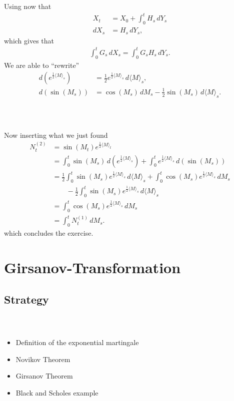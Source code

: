\documentclass{beamer}
\numberwithin{equation}{section}
\newenvironment{frame2}{\begin{frame}\frametitle{{\normalsize \secname} \\ {\large \subsecname}}}{\end{frame}}
\begin{document}
\begin{frame2}
    Using now that
    \begin{align*}
        X_t &= X_0 + \int_0^t H_s \, dY_s \\
        dX_s &= H_s \, dY_s, 
    \end{align*}
    which gives that
    \begin{align*}
        \int_0^t G_s \, d X_s = \int_0^t G_s H_s \, dY_s.
    \end{align*}
    We are able to ``rewrite''
    \begin{align*}
        d\left(e^{\frac{1}{2}\langle M \rangle_s}\right) &= \frac{1}{2}e^{\frac{1}{2}\langle M \rangle_s} \, d \langle M \rangle_s, \\
        d \left(\sin(M_s)\right) &= \cos(M_s) \, dM_s - \frac{1}{2}\sin(M_s)\, d\langle M \rangle_s.
    \end{align*}
\end{frame2}

\begin{frame2}
    Now inserting what we just found
    \begin{align*}
        N_t^{(2)} &= \sin(M_t)e^{\frac{1}{2}\langle M \rangle_t} \\
       &= \int_0^t \sin(M_s) \, d\left(e^{\frac{1}{2}\langle M \rangle_s}\right) + \int_0^t e^{\frac{1}{2}\langle M \rangle_s} \, d \left(\sin(M_s)\right) \\
       &= \frac{1}{2}\int_0^t\sin(M_s)e^{\frac{1}{2}\langle M \rangle_s}\, d\langle M \rangle_s + \int_0^t\cos(M_s)e^{\frac{1}{2}\langle M \rangle_s}\, dM_s \\
       &\qquad - \frac{1}{2}\int_0^t\sin(M_s)e^{\frac{1}{2}\langle M \rangle_s}\, d\langle M \rangle_s \\
       &= \int_0^t\cos(M_s)e^{\frac{1}{2}\langle M \rangle_s}\, dM_s \\
       &= \int_0^tN_t^{(1)} \, dM_s.
   \end{align*}
   which concludes the exercise.
\end{frame2}

\section{Girsanov-Transformation}

\subsection{Strategy}
\begin{frame2}
    \begin{itemize}
        \item Definition of the exponential martingale
        \item Novikov Theorem
        \item Girsanov Theorem
        \item Black and Scholes example
    \end{itemize}
\end{frame2}
\end{document}
